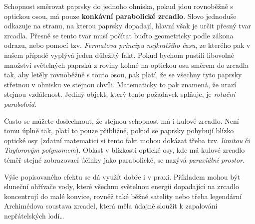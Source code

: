 \documentclass{../../../../style/mkimain}
\begin{document}
\noindent{}
\klein
Schopnost směrovat paprsky do jednoho ohniska, pokud jdou rovnoběžně s optickou osou, má pouze \textbf{konkávní parabolické zrcadlo}.
Slovo  jednoduše odkazuje na stranu, na kterou paprsky dopadají, hlavní však je určit přesný tvar zrcadla.
Přesně se tento tvar musí počítat buďto geometricky podle zákona odrazu, nebo pomocí tzv. \emph{Fermatova principu nejkratšího času},
ze kterého pak v našem případě vyplývá jeden důležitý fakt.
Pokud bychom pustili libovolné množství světelných paprsků z roviny kolmé na optickou osu směrem do zrcadla tak,
aby letěly rovnoběžně s touto osou, pak platí, že se všechny tyto paprsky střetnou v ohnisku ve stejnou chvíli.
Matematicky to pak znamená, že urazí stejnou vzdálenost. Jediný objekt, který tento požadavek splňuje, je \emph{rotační paraboloid}.

Často se můžete doslechnout, že stejnou schopnost má i kulové zrcadlo. Není tomu úplně tak, platí to pouze přibližně,
pokud se paprsky pohybují blízko optické osy (zdatní matematici si tento fakt mohou dokázat třeba tzv.
\emph{limitou} či \emph{Taylorovým polynomem}).
Oblast v blízkosti optické osy, kde má kulové zrcadlo téměř stejné zobrazovací účinky jako parabolické, se nazývá \emph{paraxiální prostor}.


Výše popisovaného efektu se dá využít dobře i v praxi.
Příkladem mohou být sluneční ohřívače vody, které všechnu světelnou energii dopadající na zrcadlo koncentrují do malé konvice,
rovněž také běžné satelity nebo třeba legendární Archimédova soustava zrcadel, která měla údajně sloužit k zapalování nepřátelských lodí\dots 
\end{document}
